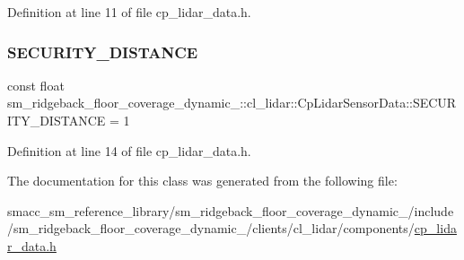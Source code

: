 Definition at line 11 of file cp\+\_\+lidar\+\_\+data.\+h.

\mbox{\label{classsm__ridgeback__floor__coverage__dynamic__1_1_1cl__lidar_1_1CpLidarSensorData_ad3d11d79183ef8e77828db7e34d8da94}} 
\subsubsection{\texorpdfstring{S\+E\+C\+U\+R\+I\+T\+Y\+\_\+\+D\+I\+S\+T\+A\+N\+CE}{SECURITY\_DISTANCE}}
{\footnotesize\ttfamily const float sm\+\_\+ridgeback\+\_\+floor\+\_\+coverage\+\_\+dynamic\+\_\+::cl\+\_\+lidar\+::\+Cp\+Lidar\+Sensor\+Data\+::\+S\+E\+C\+U\+R\+I\+T\+Y\+\_\+\+D\+I\+S\+T\+A\+N\+CE = 1}



Definition at line 14 of file cp\+\_\+lidar\+\_\+data.\+h.



The documentation for this class was generated from the following file\+:\begin{DoxyCompactItemize}
\item 
smacc\+\_\+sm\+\_\+reference\+\_\+library/sm\+\_\+ridgeback\+\_\+floor\+\_\+coverage\+\_\+dynamic\+\_/include/sm\+\_\+ridgeback\+\_\+floor\+\_\+coverage\+\_\+dynamic\+\_/clients/cl\+\_\+lidar/components/\hyperlink{sm__ridgeback__floor__coverage__dynamic__1_2include_2sm__ridgeback__floor__coverage__dynamic__1_261617c1c9c12ae5d919a7e7a6455b78}{cp\+\_\+lidar\+\_\+data.\+h}\end{DoxyCompactItemize}
